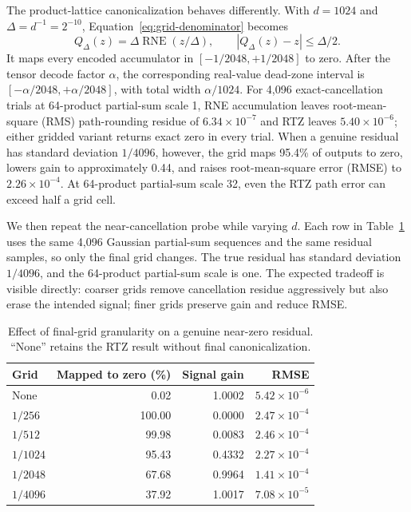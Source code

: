 \documentclass[11pt]{article}
\begin{document}
The product-lattice canonicalization behaves differently.  With
$d=1024$ and $\Delta=d^{-1}=2^{-10}$, Equation~\ref{eq:grid-denominator}
becomes
\begin{equation}
  Q_{\Delta}(z)=\Delta\operatorname{RNE}(z/\Delta),
  \qquad |Q_{\Delta}(z)-z|\leq \Delta/2.
  \label{eq:grid-denoiser}
\end{equation}
It maps every encoded accumulator in $[-1/2048,+1/2048]$ to zero.  After the
tensor decode factor $\alpha$, the corresponding real-value dead-zone interval
is $[-\alpha/2048,+\alpha/2048]$, with total width $\alpha/1024$.
For 4,096 exact-cancellation trials at 64-product partial-sum scale 1, RNE accumulation
leaves root-mean-square (RMS) path-rounding residue of $6.34\times10^{-7}$ and RTZ leaves
$5.40\times10^{-6}$; either gridded variant returns exact zero in every trial.
When a genuine residual has standard deviation $1/4096$, however, the grid
maps 95.4\% of outputs to zero, lowers gain to approximately 0.44, and raises
root-mean-square error (RMSE) to $2.26\times10^{-4}$.  At 64-product partial-sum scale 32, even the RTZ path error
can exceed half a grid cell.

We then repeat the near-cancellation probe while varying $d$.  Each row in
Table~\ref{tab:grid-denominator-statistics} uses the same 4,096 Gaussian
partial-sum sequences and the same residual samples, so only the final grid
changes.  The true residual has standard deviation $1/4096$, and the
64-product partial-sum scale is one.  The expected tradeoff is visible directly: coarser grids
remove cancellation residue aggressively but also erase the intended signal;
finer grids preserve gain and reduce RMSE.

\begin{table}[H]
  \centering
  \small
  \caption{Effect of final-grid granularity on a genuine near-zero residual.
  ``None'' retains the RTZ result without final canonicalization.}
  \label{tab:grid-denominator-statistics}
  \begin{tabular}{@{}lrrr@{}}
    \toprule
    Grid & Mapped to zero (\%) & Signal gain & RMSE \\
    \midrule
    None     & 0.02  & 1.0002 & $5.42\times10^{-6}$ \\
    $1/256$  & 100.00 & 0.0000 & $2.47\times10^{-4}$ \\
    $1/512$  & 99.98 & 0.0083 & $2.46\times10^{-4}$ \\
    $1/1024$ & 95.43 & 0.4332 & $2.27\times10^{-4}$ \\
    $1/2048$ & 67.68 & 0.9964 & $1.41\times10^{-4}$ \\
    $1/4096$ & 37.92 & 1.0017 & $7.08\times10^{-5}$ \\
    \bottomrule
  \end{tabular}
\end{table}
\end{document}
